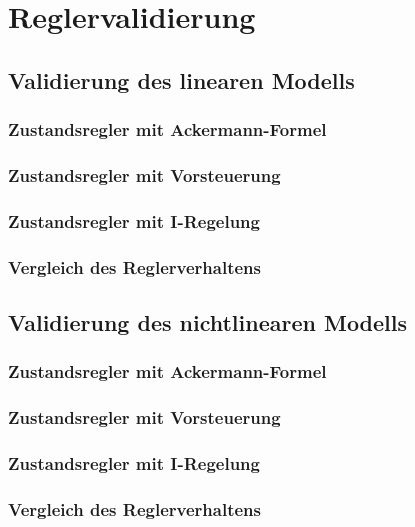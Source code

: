 \section{Reglervalidierung} \label{sec:Reglervalidierung}

\subsection{Validierung des linearen Modells} \label{sec:Vergleich_linear}

\subsubsection{Zustandsregler mit Ackermann-Formel}

\subsubsection{Zustandsregler mit Vorsteuerung}

\subsubsection{Zustandsregler mit I-Regelung}

\subsubsection{Vergleich des Reglerverhaltens}

\subsection{Validierung des nichtlinearen Modells} \label{sec:Vergleich_nichtlinear}

\subsubsection{Zustandsregler mit Ackermann-Formel}

\subsubsection{Zustandsregler mit Vorsteuerung}

\subsubsection{Zustandsregler mit I-Regelung}

\subsubsection{Vergleich des Reglerverhaltens}
